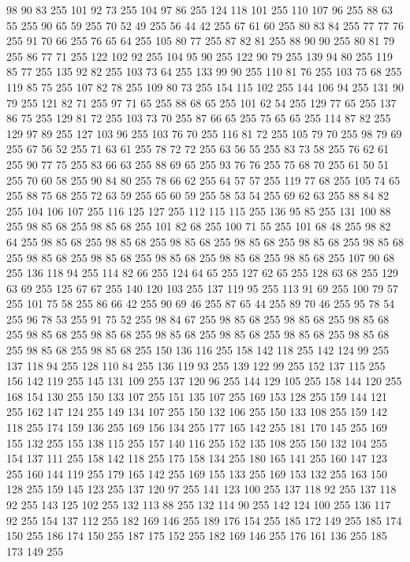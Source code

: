 98 90 83 255 101 92 73 255 104 97 86 255 124 118 101 255 110 107 96 255 88 63 55 255 90 65 59 255 70 52 49 255 56 44 42 255 67 61 60 255 80 83 84 255 77 77 76 255 91 70 66 255 76 65 64 255 105 80 77 255 87 82 81 255 88 90 90 255 80 81 79 255 86 77 71 255 122 102 92 255 104 95 90 255 122 90 79 255 139 94 80 255 119 85 77 255 135 92 82 255 103 73 64 255 133 99 90 255 110 81 76 255 103 75 68 255 119 85 75 255 107 82 78 255 109 80 73 255 154 115 102 255 144 106 94 255 131 90 79 255 121 82 71 255 97 71 65 255 88 68 65 255 101 62 54 255 129 77 65 255 137 86 75 255 129 81 72 255 103 73 70 255 87 66 65 255 75 65 65 255 114 87 82 255 129 97 89 255 127 103 96 255 103 76 70 255 116 81 72 255 105 79 70 255 98 79 69 255 67 56 52 255 71 63 61 255 78 72 72 255 63 56 55 255 83 73 58 255 76 62 61 255 90 77 75 255 83 66 63 255 88 69 65 255 93 76 76 255 75 68 70 255 61 50 51 255
70 60 58 255 90 84 80 255 78 66 62 255 64 57 57 255 119 77 68 255 105 74 65 255 88 75 68 255 72 63 59 255 65 60 59 255 58 53 54 255 69 62 63 255 88 84 82 255 104 106 107 255 116 125 127 255 112 115 115 255 136 95 85 255 131 100 88 255 98 85 68 255 98 85 68 255 101 82 68 255 100 71 55 255 101 68 48 255 98 82 64 255 98 85 68 255 98 85 68 255 98 85 68 255 98 85 68 255 98 85 68 255 98 85 68 255 98 85 68 255 98 85 68 255 98 85 68 255 98 85 68 255 98 85 68 255 107 90 68 255 136 118 94 255 114 82 66 255 124 64 65 255 127 62 65 255 128 63 68 255 129 63 69 255 125 67 67 255 140 120 103 255 137 119 95 255 113 91 69 255 100 79 57 255 101 75 58 255 86 66 42 255 90 69 46 255 87 65 44 255 89 70 46 255 95 78 54 255 96 78 53 255 91 75 52 255 98 84 67 255 98 85 68 255 98 85 68 255 98 85 68 255 98 85 68 255 98 85 68 255 98 85 68 255 98 85 68 255 98 85 68 255 98 85 68 255
98 85 68 255 98 85 68 255 150 136 116 255 158 142 118 255 142 124 99 255 137 118 94 255 128 110 84 255 136 119 93 255 139 122 99 255 152 137 115 255 156 142 119 255 145 131 109 255 137 120 96 255 144 129 105 255 158 144 120 255 168 154 130 255 150 133 107 255 151 135 107 255 169 153 128 255 159 144 121 255 162 147 124 255 149 134 107 255 150 132 106 255 150 133 108 255 159 142 118 255 174 159 136 255 169 156 134 255 177 165 142 255 181 170 145 255 169 155 132 255 155 138 115 255 157 140 116 255 152 135 108 255 150 132 104 255 154 137 111 255 158 142 118 255 175 158 134 255 180 165 141 255 160 147 123 255 160 144 119 255 179 165 142 255 169 155 133 255 169 153 132 255 163 150 128 255 159 145 123 255 137 120 97 255 141 123 100 255 137 118 92 255 137 118 92 255 143 125 102 255 132 113 88 255 132 114 90 255 142 124 100 255 136 117 92 255 154 137 112 255 182 169 146 255 189 176 154 255 185 172 149 255 185 174 150 255 186 174 150 255 187 175 152 255 182 169 146 255 176 161 136 255 185 173 149 255
